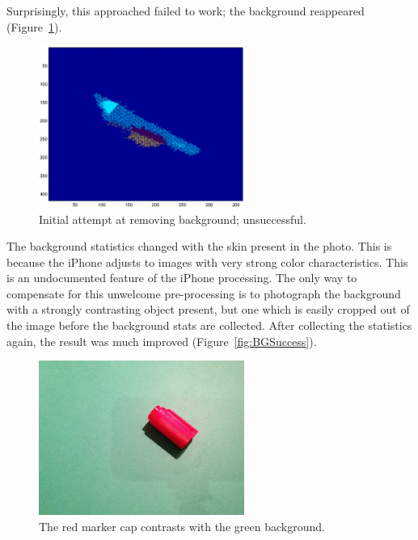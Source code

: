 Surprisingly, this approached failed to work; the background reappeared (Figure~\ref{fig:BGFailure}).

\begin{figure}[h!]
  \centering
    \includegraphics[width=0.60\textwidth]{Chapter2/Figs/xy_bg_failed.eps}
    \caption{Initial attempt at removing background; unsuccessful.} \label{fig:BGFailure}
\end{figure}

The background statistics changed with the skin present in the photo. This is because the iPhone adjusts to images with very strong color characteristics. This is an undocumented feature of the iPhone processing. The only way to compensate for this unwelcome pre-processing is to photograph the background with a strongly contrasting object present, but one which is easily cropped out of the image before the background stats are collected. After collecting the statistics again, the result was much improved (Figure~\ref{fig:BGSuccess}).

\begin{figure}[h!]
  \centering
    \includegraphics[width=0.60\textwidth]{Chapter2/Figs/bg_cap.eps}
    \caption{The red marker cap contrasts with the green background.}  \label{fig:BGCap}
\end{figure}

